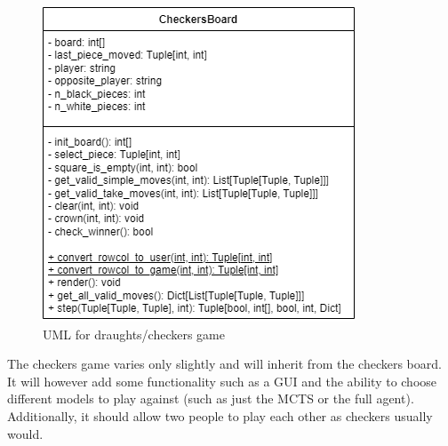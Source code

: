 \documentclass{article}
\begin{document}
    \begin{figure}[h]
        \centering
        \includegraphics[scale = 0.72]{DraughtsUML.png}
        \caption{UML for draughts/checkers game}
    \end{figure}

    The checkers game varies only slightly and will inherit from the checkers board. It will however add some functionality such as a GUI and the ability to choose different
    models to play against (such as just the MCTS or the full agent). Additionally, it should allow two people to play each other as checkers usually would.
\end{document}
